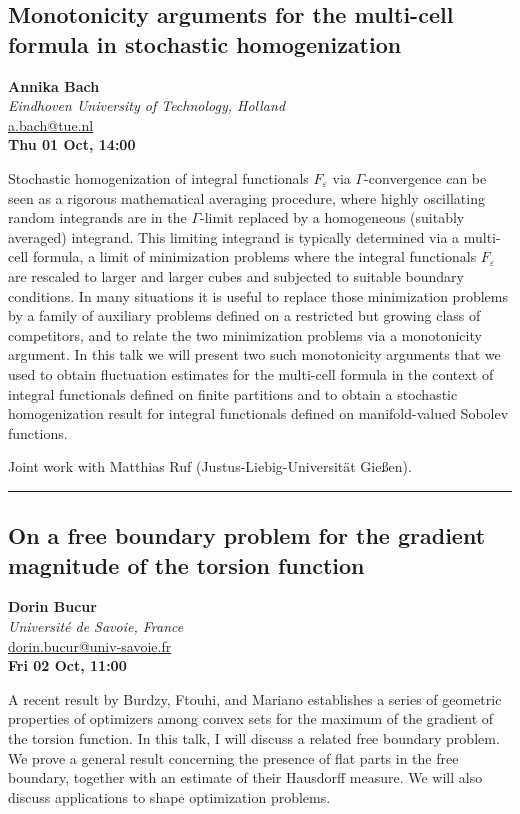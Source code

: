 \documentclass[a4paper,11pt]{article}
\begin{document}
\begin{center}
\subsection*{Monotonicity arguments for the multi-cell formula in stochastic homogenization}

\textbf{Annika Bach} \\
\textit{Eindhoven University of Technology, Holland} \\
\url{a.bach@tue.nl} \\
\textbf{Thu 01 Oct, 14:00}
\
\end{center}
\medskip
Stochastic homogenization of integral functionals $F_\varepsilon$ via $\Gamma$-convergence can be seen as a rigorous mathematical averaging procedure, where highly oscillating random integrands are in the $\Gamma$-limit replaced by a homogeneous (suitably averaged) integrand. This limiting integrand is typically determined via a multi-cell formula, a limit of minimization problems where the integral functionals $F_\varepsilon$ are rescaled to larger and larger cubes and subjected to suitable boundary conditions. In many situations it is useful to replace those minimization problems by a family of auxiliary problems defined on a restricted but growing class of competitors, and to relate the two minimization problems via a monotonicity argument. In this talk we will present two such monotonicity arguments that we used to obtain fluctuation estimates for the multi-cell formula in the context of integral functionals defined on finite partitions and to obtain a stochastic homogenization result for integral functionals defined on manifold-valued Sobolev functions.

\smallskip
Joint work with Matthias Ruf (Justus-Liebig-Universität Gießen).

\newpage

\noindent\rule{\textwidth}{0.4pt}

\begin{center}
\subsection*{On a free boundary problem for the gradient magnitude of the torsion function}

\textbf{Dorin Bucur} \\
\textit{Université de Savoie, France} \\
\url{dorin.bucur@univ-savoie.fr} \\
\textbf{Fri 02 Oct, 11:00}
\
\end{center}
\medskip
A recent result by Burdzy, Ftouhi, and Mariano establishes a series of geometric properties of optimizers among convex sets for the maximum of the gradient of the torsion function. In this talk, I will discuss a related free boundary problem. We prove a general result concerning the presence of flat parts in the free boundary, together with an estimate of their Hausdorff measure. We will also discuss applications to shape optimization problems.
\end{document}
